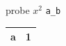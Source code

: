 \documentclass[10pt]{article}
\begin{document}
probe $x^2$ \texttt{a\_b}
\begin{tabular}{lr}\toprule a & 1\\\bottomrule\end{tabular}
\end{document}
